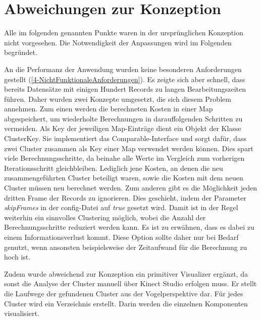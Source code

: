 \clearpage
\section{Abweichungen zur Konzeption}
\label{5-AbweichungenKonzeption}
Alle im folgenden genannten Punkte waren in der ursprünglichen Konzeption nicht vorgesehen.
Die Notwendigkeit der Anpassungen wird im Folgenden begründet.

An die Performanz der Anwendung wurden keine besonderen Anforderungen gestellt
(\autoref{4-NichtFunktionaleAnforderungen}).
Es zeigte sich aber schnell, dass bereits Datensätze mit einigen Hundert Records zu langen Bearbeitungszeiten führen.
Daher wurden zwei Konzepte umgesetzt, die sich diesem Problem annehmen.
Zum einen werden die berechneten Kosten in einer Map abgespeichert,
um wiederholte Berechnungen in darauffolgenden Schritten zu vermeiden.
Als Key der jeweiligen Map-Einträge dient ein Objekt der Klasse ClusterKey.
Sie implementiert das Comparable-Interface und sorgt dafür,
dass zwei Cluster zusammen als Key einer Map verwendet werden können.
Dies spart viele Berechnungsschritte,
da beinahe alle Werte im Vergleich zum vorherigen Iterationsschritt gleichbleiben.
Lediglich jene Kosten, an denen die neu zusammengeführten Cluster beteiligt waren,
sowie die Kosten mit dem neuen Cluster müssen neu berechnet werden.
Zum anderen gibt es die Möglichkeit jeden dritten Frame der Records zu ignorieren.
Dies geschieht, indem der Parameter \emph{skipFrames} in der config-Datei auf \emph{true} gesetzt wird.
Damit ist in der Regel weiterhin ein sinnvolles Clustering möglich,
wobei die Anzahl der Berechnungsschritte reduziert werden kann.
Es ist zu erwähnen, dass es dabei zu einem Informationsverlust kommt.
Diese Option sollte daher nur bei Bedarf genutzt,
wenn ansonsten beispielsweise der Zeitaufwand für die Berechnung zu hoch ist.

Zudem wurde abweichend zur Konzeption ein primitiver Visualizer ergänzt,
da sonst die Analyse der Cluster manuell über Kinect Studio erfolgen muss.
Er stellt die Laufwege der gefundenen Cluster aus der Vogelperspektive dar.
Für jedes Cluster wird ein Verzeichnis erstellt.
Darin werden die einzelnen Komponenten visualisiert.